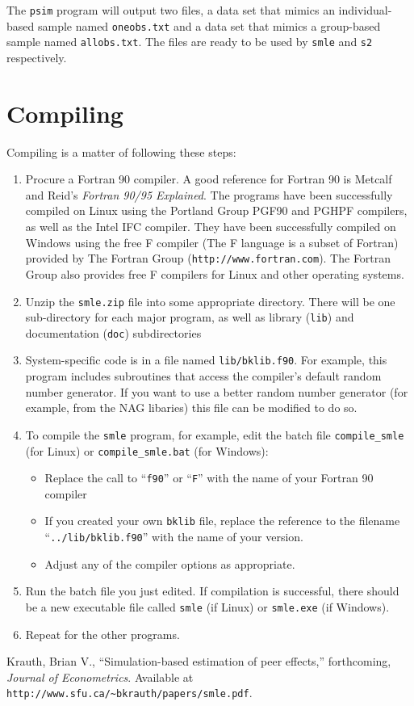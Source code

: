 \documentclass{article}
\begin{document}
The {\tt psim} program will output two files, a data set that mimics an individual-based
sample named {\tt oneobs.txt} and a data set that mimics a group-based sample named
{\tt allobs.txt}.  The files are ready to be used by {\tt smle} and {\tt s2} respectively.

\appendix

\section{Compiling}\label{sec:compiling}

Compiling is a matter of following these steps:
\begin{enumerate}
\item Procure a Fortran 90 compiler. A good reference for Fortran 90 is 
	Metcalf and Reid's {\it Fortran 90/95 Explained}.  The programs have been 
	successfully compiled on Linux using the Portland Group PGF90 and 
	PGHPF compilers, as well as the Intel IFC compiler.  They have been successfully
	compiled on Windows using the free F compiler (The F language is a subset of 
	Fortran) provided by The Fortran Group ({\tt http://www.fortran.com}).  
	The Fortran Group also provides free F compilers for Linux and other
	operating systems.
\item Unzip the {\tt smle.zip} file into some appropriate directory.
	There will be one sub-directory for each major program, as well as 
	library ({\tt lib}) and documentation ({\tt doc}) subdirectories
\item System-specific code is in a file named {\tt lib/bklib.f90}.
  For example, this program includes subroutines that access the 
  compiler's default random number generator.  If you want to 
  use a better random number generator (for example, from the NAG libaries)
  this file can be modified to do so.
\item To compile the {\tt smle} program, for example, 
	edit the batch file {\tt compile\_{}smle} (for Linux) or {\tt compile\_smle.bat} (for Windows):
	\begin{itemize}
		\item Replace the call to ``{\tt f90}'' or ``{\tt F}'' with the name of your Fortran 90 compiler
		\item If you created your own {\tt bklib} file, replace the 
			reference to the filename ``{\tt ../lib/bklib.f90}'' with the name of your version.
		\item Adjust any of the compiler options as appropriate.
	\end{itemize}
\item Run the batch file you just edited.  If compilation is successful, there should be
	a new executable file called {\tt smle} (if Linux) or {\tt smle.exe} (if Windows).
\item Repeat for the other programs.
\end{enumerate}

\begin{thebibliography}{breitestes Label}
Krauth, Brian V., ``Simulation-based estimation of peer effects,'' forthcoming,
{\it Journal of Econometrics}.  Available at 
{\tt http://www.sfu.ca/\~{}bkrauth/papers/smle.pdf}.
	
\end{thebibliography}
\end{document}
